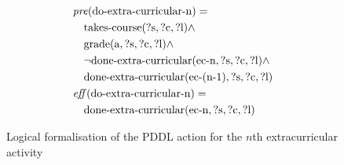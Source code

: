 \begin{figure}[t]
  \small  %
  \begin{align*}
  &\mathit{pre}(\text{do-extra-curricular-n}) = \\
  &\quad \text{takes-course}(\text{?s}, \text{?c}, \text{?l}) \land \\
  &\quad \text{grade}(\text{a}, \text{?s}, \text{?c}, \text{?l}) \land \\
  &\quad \lnot \text{done-extra-curricular}(\text{ec-n}, \text{?s}, \text{?c}, \text{?l}) \land \\
  &\quad \text{done-extra-curricular}(\text{ec-(n-1)}, \text{?s}, \text{?c}, \text{?l}) \\
  &\mathit{eff}(\text{do-extra-curricular-n}) = \\
  &\quad \text{done-extra-curricular}(\text{ec-n}, \text{?s}, \text{?c}, \text{?l})
  \end{align*}
  \caption{Logical formalisation of the PDDL action for the $n$th extracurricular activity}\label{fig:extra-curricular-n}
\end{figure}